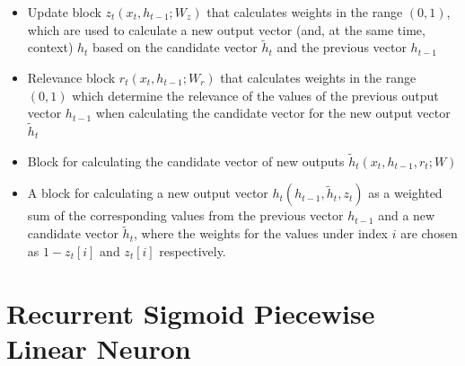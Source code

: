 \documentclass[sn-apa]{sn-jnl}%
\begin{document}
\begin{itemize}
\item Update block $z_t(x_t,h_{t-1};W_z)$ that calculates weights in the range $(0, 1)$, which are used to calculate a new output vector (and, at the same time, context) $h_t$ based on the candidate vector $\tilde{h}_t$ and the previous vector $h_{t-1}$
\item Relevance block $r_t(x_t,h_{t-1};W_r)$ that calculates weights in the range $(0, 1)$ which determine the relevance of the values of the previous output vector $h_{t-1}$ when calculating the candidate vector for the new output vector $\tilde{h}_t$
\item Block for calculating the candidate vector of new outputs $\tilde{h}_t(x_t,h_{t-1},r_t;W)$
\item A block for calculating a new output vector $h_t(h_{t-1},\tilde{h}_t,z_t)$  as a weighted sum of the corresponding values from the previous vector $h_{t-1}$ and a new candidate vector $\tilde{h}_t$, where the weights for the values under index $i$ are chosen as $1-z_t[i]$ and $z_t[i]$ respectively. 
\end{itemize}

\section{Recurrent Sigmoid Piecewise Linear Neuron}\label{sec5}
\end{document}
